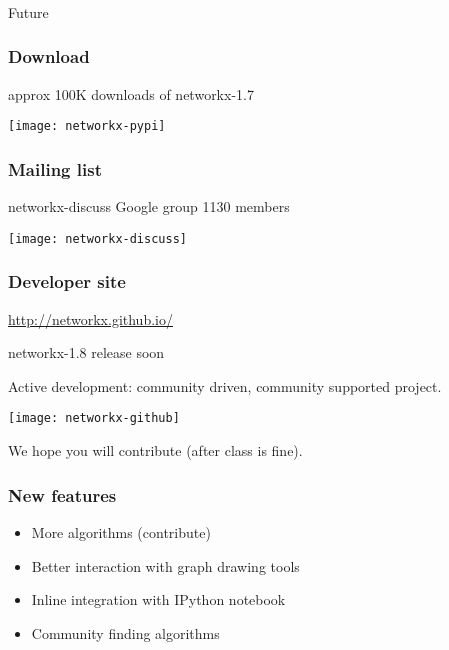 \begin{frame}
\frametitle{}
\begin{center}
{\fontsize{49}{90}\selectfont
{\color{title} Future}}
\end{center}
\end{frame}

\begin{frame}
\frametitle{Download} approx 100K downloads of networkx-1.7
{\Large }

\bigskip

\centerline{\texttt{[image: networkx-pypi]}}

\end{frame}


\begin{frame}
\frametitle{Mailing list}

{\Large networkx-discuss Google group}
1130 members
\bigskip

\centerline{\texttt{[image: networkx-discuss]}}

\end{frame}


\begin{frame}
\frametitle{Developer site}
{\Large \url{http://networkx.github.io/}}

networkx-1.8 release soon

Active development: community driven, community supported project.

\centerline{\texttt{[image: networkx-github]}}


We hope you will contribute (after class is fine).

\end{frame}

\begin{frame}
\frametitle{New features}
\begin{itemize}
\item More algorithms (contribute)
\item Better interaction with graph drawing tools
\item Inline integration with IPython notebook
\item Community finding algorithms
\end{itemize}

\end{frame}
